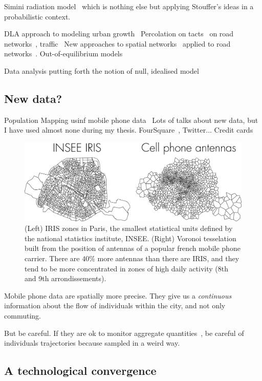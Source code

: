 Simini radiation model~\cite{Simini:2012,Simini:2013} which is nothing else but
applying Stouffer's ideas in a probabilistic context.

DLA approach to modeling urban growth~\cite{Makse:1995}
Percolation on tacts~\cite{Rozenfel:2008} on road networks~\cite{Masucci:2015},
traffic~\cite{Li:2015}
New approaches to spatial networks~\cite{Barthelemy:2011} applied to road
networks~\cite{Barthelemy:2008}.
Out-of-equilibrium models~\cite{Louf:2013_polycentric}

Data analysis putting forth the notion of null, idealised
model~\cite{Louf:2014_scaling}

    \subsection{New data?}
    \label{sub:new_data}

Population Mapping usinf mobile phone data~\cite{Deville:2014}
Lots of talks about new data, but I have used almost none during my thesis.
FourSquare~\cite{Noulas:2012}, Twitter... Credit cards~\cite{Lenormand:2015}

\begin{figure}
    \centering
    \includegraphics[width=\textwidth]{gfx/chapter-intro/IRIS_phone.pdf}
    \caption{(Left) IRIS zones in Paris, the smallest statistical units defined
    by the national statistics institute, INSEE. (Right) Voronoi tesselation
    built from the position of antennas of a popular french mobile phone carrier.
    There are $40\%$ more antennas than there are IRIS, and they tend to be more
    concentrated in zones of high daily activity (8th and 9th
    arrondissements).\label{fig:IRIS_phone}}
\end{figure}

Mobile phone data are spatially more precise. They give us a \emph{continuous}
information about the flow of individuals within the city, and not only
commuting.

But be careful. If they are ok to monitor aggregate
quantities~\cite{Lenormand:2014}, be careful of
individuals trajectories because sampled in a weird way.

    \subsection{A technological convergence}
    \label{sub:a_technological_convergence} 


